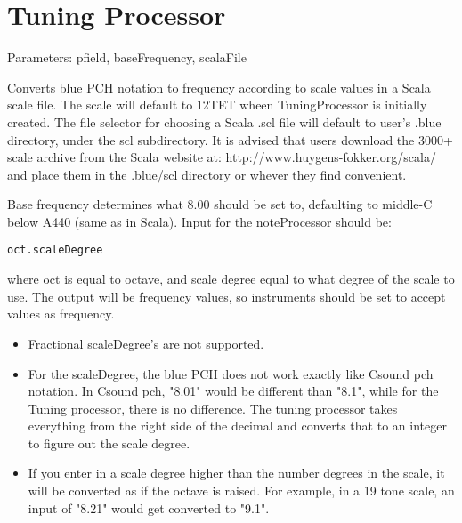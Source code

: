 \section{Tuning Processor}\label{tuningProcessor}

Parameters: pfield, baseFrequency, scalaFile

Converts blue PCH notation to frequency according to scale values in a
Scala scale file. The scale will default to 12TET wheen TuningProcessor
is initially created. The file selector for choosing a Scala .scl file
will default to user's .blue directory, under the scl subdirectory. It
is advised that users download the 3000+ scale archive from the Scala
website at: http://www.huygens-fokker.org/scala/ and place them in the
.blue/scl directory or whever they find convenient.

Base frequency determines what 8.00 should be set to, defaulting to
middle-C below A440 (same as in Scala). Input for the noteProcessor
should be:

\begin{verbatim}
oct.scaleDegree
\end{verbatim}

where oct is equal to octave, and scale degree equal to what degree of
the scale to use. The output will be frequency values, so instruments
should be set to accept values as frequency.

\begin{itemize}
\item
  Fractional scaleDegree's are not supported.
\item
  For the scaleDegree, the blue PCH does not work exactly like Csound
  pch notation. In Csound pch, "8.01" would be different than "8.1",
  while for the Tuning processor, there is no difference. The tuning
  processor takes everything from the right side of the decimal and
  converts that to an integer to figure out the scale degree.
\item
  If you enter in a scale degree higher than the number degrees in the
  scale, it will be converted as if the octave is raised. For example,
  in a 19 tone scale, an input of "8.21" would get converted to "9.1".
\end{itemize}
